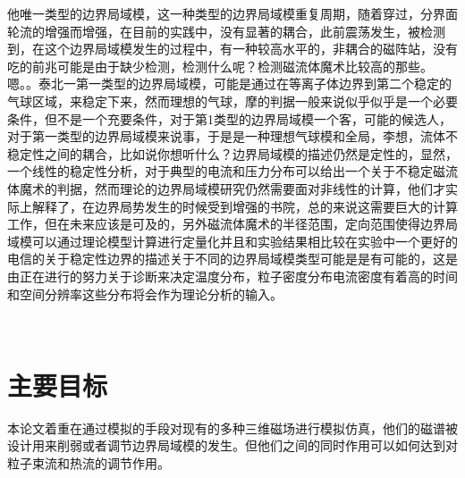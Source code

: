 他唯一类型的边界局域模，这一种类型的边界局域模重复周期，随着穿过，分界面轮流的增强而增强，在目前的实践中，没有显著的耦合，此前震荡发生，被检测到，在这个边界局域模发生的过程中，有一种较高水平的，非耦合的磁阵站，没有吃的前兆可能是由于缺少检测，检测什么呢？检测磁流体魔术比较高的那些。嗯。。泰北一第一类型的边界局域模，可能是通过在等离子体边界到第二个稳定的气球区域，来稳定下来，然而理想的气球，摩的判据一般来说似乎似乎是一个必要条件，但不是一个充要条件，对于第1类型的边界局域模一个客，可能的候选人，对于第一类型的边界局域模来说事，于是是一种理想气球模和全局，李想，流体不稳定性之间的耦合，比如说你想听什么？边界局域模的描述仍然是定性的，显然，一个线性的稳定性分析，对于典型的电流和压力分布可以给出一个关于不稳定磁流体魔术的判据，然而理论的边界局域模研究仍然需要面对非线性的计算，他们才实际上解释了，在边界局势发生的时候受到增强的书院，总的来说这需要巨大的计算工作，但在未来应该是可及的，另外磁流体魔术的半径范围，定向范围使得边界局域模可以通过理论模型计算进行定量化并且和实验结果相比较在实验中一个更好的电信的关于稳定性边界的描述关于不同的边界局域模类型可能是是有可能的，这是由正在进行的努力关于诊断来决定温度分布，粒子密度分布电流密度有着高的时间和空间分辨率这些分布将会作为理论分析的输入。

​\section{主要目标}
本论文着重在通过模拟的手段对现有的多种三维磁场进行模拟仿真，他们的磁谱被设计用来削弱或者调节边界局域模的发生。但他们之间的同时作用可以如何达到对粒子束流和热流的调节作用。